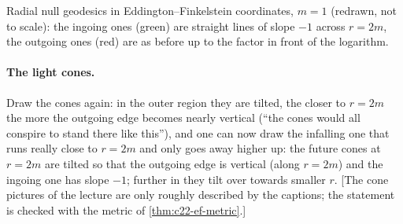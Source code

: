 \begin{paracol}{2}
\begin{nfigure}
\caption{Radial null geodesics in Eddington--Finkelstein coordinates, $m=1$ (redrawn, not to scale): the ingoing ones (green) are straight lines of slope $-1$ across $r=2m$, the outgoing ones (red) are as before up to the factor in front of the logarithm.}\label{fig:c22-ef}
\end{nfigure}

\paragraph{The light cones.} Draw the cones again: in the outer region they are tilted, the closer to $r=2m$ the more the outgoing edge becomes nearly vertical (``the cones would all conspire to stand there like this''), and one can now draw the infalling one that runs really close to $r=2m$ and only goes away higher up: the future cones at $r=2m$ are tilted so that the outgoing edge is vertical (along $r=2m$) and the ingoing one has slope $-1$; further in they tilt over towards smaller $r$. [The cone pictures of the lecture are only roughly described by the captions; the statement is checked with the metric of \cref{thm:c22-ef-metric}.] 


\end{paracol}
